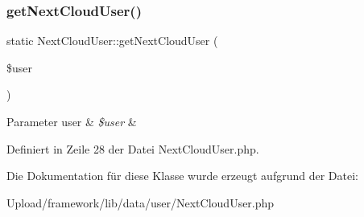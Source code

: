 \subsubsection{\texorpdfstring{get\+Next\+Cloud\+User()}{getNextCloudUser()}}
{\footnotesize\ttfamily static Next\+Cloud\+User\+::get\+Next\+Cloud\+User (\begin{DoxyParamCaption}\item[{}]{\$user }\end{DoxyParamCaption})\hspace{0.3cm}{\ttfamily [static]}}


\begin{DoxyParams}[1]{Parameter}
user & {\em \$user} & \\
\hline
\end{DoxyParams}


Definiert in Zeile 28 der Datei Next\+Cloud\+User.\+php.



Die Dokumentation für diese Klasse wurde erzeugt aufgrund der Datei\+:\begin{DoxyCompactItemize}
\item 
Upload/framework/lib/data/user/Next\+Cloud\+User.\+php\end{DoxyCompactItemize}
